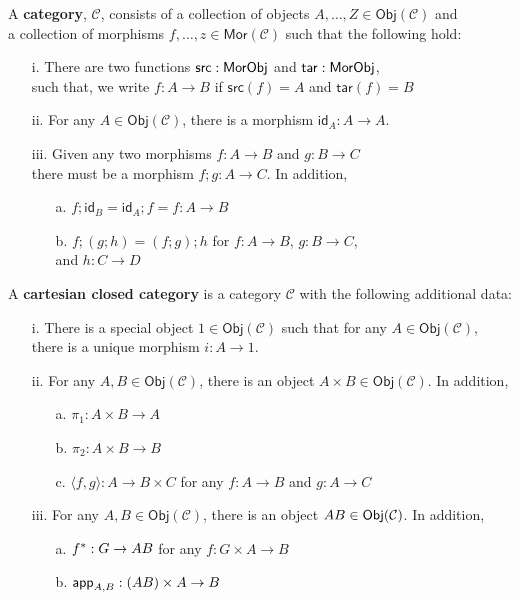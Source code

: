 \documentclass{article}
\let\mto\to
\let\to\relax
\newcommand{\to}{\rightarrow}
\newcommand{\cat}[1]{\mathcal{#1}}
\newcommand{\id}[0]{\mathsf{id}}
\begin{document}
\noindent
A \textbf{category}, $\mathcal{C}$, consists of a collection of objects $A,\ldots,Z \in \mathsf{Obj}(\mathcal{C})$ and \\
a collection of morphisms $f,\ldots,z \in \mathsf{Mor}(\mathcal{C})$ such that the
following hold:
\begin{itemize}
\item [i.] There are two functions $\mathsf{src} : \mathsf{Mor} \to
  \mathsf{Obj}$ and $\mathsf{tar} : \mathsf{Mor} \to \mathsf{Obj}$,\\
  such that, we write $f : A \mto B$ if $\mathsf{src}(f) = A$ and
  $\mathsf{tar}(f) = B$
\item[ii.] For any $A \in \mathsf{Obj}(\mathcal{C})$, there is a
  morphism $\mathsf{id}_A : A \mto A$.
\item[iii.] Given any two morphisms $f : A \mto B$ and $g : B \mto C$\\
  there must be a morphism $f;g : A \mto C$.  In addition,
  \begin{itemize}
  \item[a.] $f;\id_B = \id_A;f = f : A \mto B$
  \item[b.] $f;(g;h) = (f;g);h$ for $f : A \mto B$, $g : B \mto C$, \\
    and $h : C \mto D$
  \end{itemize}
\item[]
\end{itemize}


\noindent
A \textbf{cartesian closed category} is a category $\cat{C}$ with the
following additional data:
\begin{itemize}
\item[i.] There is a special object $1 \in \mathsf{Obj}(\cat{C})$ such
  that for any $A \in \mathsf{Obj}(\cat{C})$,\\
  there is a unique morphism $i : A \mto 1$.
\item[ii.] For any $A,B \in \mathsf{Obj}(\cat{C})$, there is an object
  $A \times B \in \mathsf{Obj}(\cat{C})$.  In addition,
  \begin{itemize}
  \item[a.] $\pi_1 : A \times B \mto A$
  \item[b.] $\pi_2 : A \times B \mto B$
  \item[c.] $\langle f , g \rangle : A \mto B \times C$ for any $f : A \mto B$ and $g : A \mto C$
  \end{itemize}
\item[iii.] For any $A,B \in \mathsf{Obj}(\cat{C})$, there is an object
  $A \to B \in \mathsf{Obj}(\cat{C})$.  In addition,
  \begin{itemize}
  \item[a.] $f^* : G \mto A \to B$ for any $f : G \times A \mto B$
  \item[b.] $\mathsf{app}_{A,B} : (A \to B) \times A \mto B$
  \end{itemize}
\end{itemize}
\end{document}
